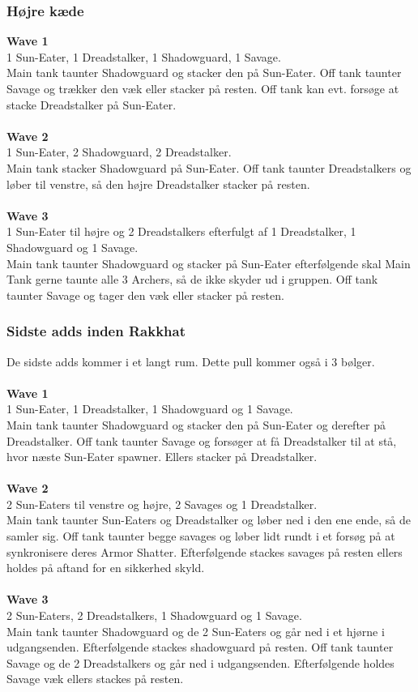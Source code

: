 \subsubsection*{Højre kæde}
\textbf{Wave 1}\\
1 Sun-Eater, 1 Dreadstalker, 1 Shadowguard, 1 Savage.\\
Main tank taunter Shadowguard og stacker den på Sun-Eater. Off tank taunter
Savage og trækker den væk eller stacker på resten. Off tank kan evt. forsøge at
stacke Dreadstalker på Sun-Eater.\\
\\
\textbf{Wave 2}\\
1 Sun-Eater, 2 Shadowguard, 2 Dreadstalker.\\
Main tank stacker Shadowguard på
Sun-Eater. Off tank taunter Dreadstalkers og løber til venstre, så den højre
Dreadstalker stacker på resten.\\
\\
\textbf{Wave 3}\\
1 Sun-Eater til højre og 2 Dreadstalkers efterfulgt af 1 Dreadstalker, 1 Shadowguard og 1
Savage.\\
Main tank taunter Shadowguard og stacker på Sun-Eater efterfølgende
skal Main Tank gerne taunte alle 3 Archers, så de ikke skyder ud i gruppen. 
Off tank taunter Savage og tager den væk eller stacker på resten.

\subsubsection*{Sidste adds inden Rakkhat}
De sidste adds kommer i et langt rum. Dette pull kommer også i 3 bølger.
\\\\
\textbf{Wave 1}\\
1 Sun-Eater, 1 Dreadstalker, 1 Shadowguard og 1 Savage. \\
Main tank taunter
Shadowguard og stacker den på Sun-Eater og derefter på Dreadstalker. Off tank
taunter Savage og forsøger at få Dreadstalker til at stå, hvor næste Sun-Eater
spawner. Ellers stacker på Dreadstalker.
\\\\
\textbf{Wave 2}\\
2 Sun-Eaters til venstre og højre, 2 Savages og 1 Dreadstalker.\\
Main tank
taunter Sun-Eaters og Dreadstalker og løber ned i den ene ende, så de samler
sig. Off tank taunter begge savages og løber lidt rundt i et forsøg på at
synkronisere deres Armor Shatter. Efterfølgende stackes savages på resten
ellers holdes på aftand for en sikkerhed skyld.
\\\\
\textbf{Wave 3}\\
2 Sun-Eaters, 2 Dreadstalkers, 1 Shadowguard og 1 Savage. \\
Main tank taunter
Shadowguard og de 2 Sun-Eaters og går ned i et hjørne i udgangsenden.
Efterfølgende stackes shadowguard på resten. Off tank
taunter Savage og de 2 Dreadstalkers og går ned i udgangsenden. Efterfølgende
holdes Savage væk ellers stackes på resten.

